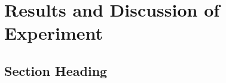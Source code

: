 \chapter{Results and Discussion of Experiment}\label{chap:chap3}
\section{Section Heading}\label{sec:heading2}